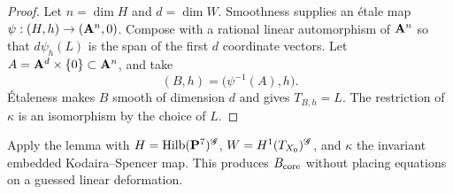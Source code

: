 \begin{proof}
Let \(n=\dim H\) and \(d=\dim W\).  Smoothness supplies an \'etale map
\(\psi:(H,h)\to(\mathbf A^n,0)\).  Compose with a rational linear automorphism of
\(\mathbf A^n\) so that \(d\psi_h(L)\) is the span of the first \(d\) coordinate
vectors.  Let \(A=\mathbf A^d\times\{0\}\subset\mathbf A^n\), and take
\[
 (B,h)=\bigl(\psi^{-1}(A),h\bigr).
\]
\'Etaleness makes \(B\) smooth of dimension \(d\) and gives
\(T_{B,h}=L\).  The restriction of \(\kappa\) is an isomorphism by the
choice of \(L\).
\end{proof}

Apply the lemma with \(H=\operatorname{Hilb}(\mathbf P^7)^{\mathscr G}\),
\(W=H^1(T_{X_0})^{\mathscr G}\), and
\(\kappa\) the invariant embedded Kodaira--Spencer map.  This produces
\(B_{\mathrm{core}}\) without placing equations on a guessed linear deformation.
